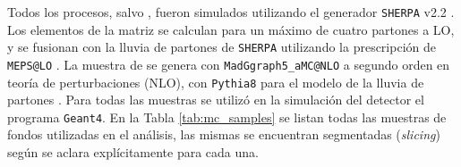 Todos los procesos, salvo \ttbarph, fueron simulados utilizando el generador {\texttt{SHERPA} v2.2} \cite{Bothmann:2019yzt}. Los elementos de la matriz se calculan para un máximo de cuatro partones
a LO, y se fusionan con la lluvia de partones de \texttt{SHERPA} \cite{Schumann:2007mg} utilizando la prescripción de \texttt{MEPS@LO} \cite{Hoeche:2012yf}. La muestra de \ttbarph se genera con \texttt{MadGgraph5\_aMC@NLO} \cite{Alwall:2014hca} a segundo orden en teoría de perturbaciones (NLO), con \texttt{Pythia8} para el modelo de la lluvia de partones \cite{Sjostrand:2014zea}. 
Para todas las muestras se utilizó en la simulación del detector el programa \texttt{Geant4}. En la Tabla \ref{tab:mc_samples} se listan todas las muestras de fondos utilizadas en el análisis, las mismas se encuentran segmentadas (\textit{slicing}) según se aclara explícitamente para cada una.

